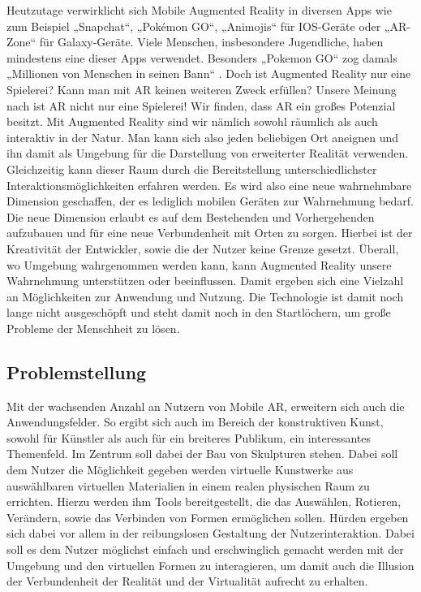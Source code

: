 \documentclass[12pt,a4paper, oneside]{scrartcl}
\begin{document}
	
Heutzutage verwirklicht sich Mobile Augmented Reality in diversen Apps wie zum Beispiel „Snapchat“, „Pokémon GO“, „Animojis“ für IOS-Geräte oder „AR-Zone“ für Galaxy-Geräte. Viele Menschen, insbesondere Jugendliche, haben mindestens eine dieser Apps verwendet. Besonders „Pokemon GO“ zog damals „Millionen von Menschen in seinen Bann“ \cite{tobien_2016}.  
Doch ist Augmented Reality nur eine Spielerei? Kann man mit AR keinen weiteren Zweck erfüllen?
Unsere Meinung nach ist AR nicht nur eine Spielerei! Wir finden, dass AR ein großes Potenzial besitzt. Mit Augmented Reality sind wir nämlich sowohl räumlich als auch interaktiv in der Natur. Man kann sich also jeden beliebigen Ort aneignen und ihn damit als  Umgebung für die Darstellung von erweiterter Realität verwenden. Gleichzeitig kann dieser Raum durch die Bereitstellung unterschiedlichster Interaktionsmöglichkeiten erfahren werden. Es wird also eine neue wahrnehmbare Dimension geschaffen, der es lediglich mobilen Geräten zur Wahrnehmung bedarf. Die neue Dimension erlaubt es auf dem Bestehenden und Vorhergehenden aufzubauen und für eine neue Verbundenheit mit Orten zu sorgen.
Hierbei ist der Kreativität der Entwickler, sowie die der Nutzer keine Grenze gesetzt. Überall, wo Umgebung wahrgenommen werden kann, kann Augmented Reality unsere Wahrnehmung unterstützen oder beeinflussen.
Damit ergeben sich eine Vielzahl an Möglichkeiten zur Anwendung und Nutzung. Die Technologie ist damit noch lange nicht ausgeschöpft und steht damit noch in den Startlöchern, um große Probleme der Menschheit zu lösen.




\newpage
	
	
	
\subsection{Problemstellung}

Mit der wachsenden Anzahl an Nutzern von Mobile AR, erweitern sich auch die Anwendungsfelder. So ergibt sich auch im Bereich der konstruktiven Kunst, sowohl für Künstler als auch für ein breiteres Publikum, ein interessantes Themenfeld.
Im Zentrum soll dabei der Bau von Skulpturen stehen. Dabei soll dem Nutzer die Möglichkeit gegeben werden virtuelle Kunstwerke aus auswählbaren virtuellen Materialien in einem realen physischen Raum zu errichten. Hierzu werden ihm Tools bereitgestellt, die das Auswählen, Rotieren, Verändern, sowie das Verbinden von Formen ermöglichen sollen. Hürden ergeben sich dabei vor allem in der reibungslosen Gestaltung der Nutzerinteraktion. Dabei soll es dem Nutzer möglichst einfach und erschwinglich gemacht werden mit der Umgebung und den virtuellen Formen zu interagieren, um damit auch die Illusion der Verbundenheit der Realität und der Virtualität aufrecht zu erhalten.
\end{document}

